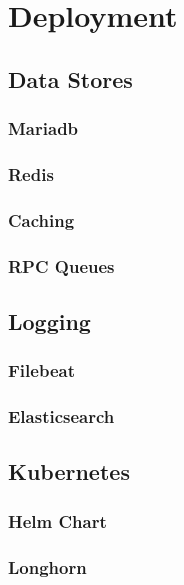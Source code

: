 \chapter{Deployment}\label{ch:deployment}

\section{Data Stores}\label{sec:data-stores}

\subsection{Mariadb}\label{sec:mariadb}

\subsection{Redis}\label{sec:redis}
\subsection{Caching}\label{sec:caching}
\subsection{RPC Queues}\label{sec:rpc-queues}

\section{Logging}\label{sec:logging}
\subsection{Filebeat}\label{sec:filebeat}
\subsection{Elasticsearch}\label{sec:elasticsearch}

\section{Kubernetes}\label{sec:kubernetes}
\subsection{Helm Chart}\label{sec:helm-chart}
\subsection{Longhorn}\label{sec:longhorn}
